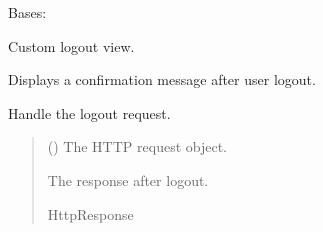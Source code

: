\documentclass[letterpaper,10pt,english]{sphinxmanual}
\begin{document}
\begin{fulllineitems}
\label{\detokenize{users:users.views.CustomLogoutView}}
\pysigstartsignatures
\pysiglinewithargsret
{}
{}
{}
\pysigstopsignatures
\sphinxAtStartPar
Bases: 

\sphinxAtStartPar
Custom logout view.

\sphinxAtStartPar
Displays a confirmation message after user logout.

\begin{fulllineitems}
\label{\detokenize{users:users.views.CustomLogoutView.dispatch}}
\pysigstartsignatures
\pysiglinewithargsret
{}
{\sphinxparamcomma {}\sphinxparamcomma {}}
{}
\pysigstopsignatures
\sphinxAtStartPar
Handle the logout request.
\begin{quote}\begin{description}
\sphinxAtStartPar
{} () \textendash{} The HTTP request object.

\sphinxAtStartPar
The response after logout.

\sphinxAtStartPar
HttpResponse

\end{description}\end{quote}

\end{fulllineitems}


\end{fulllineitems}

\end{document}
